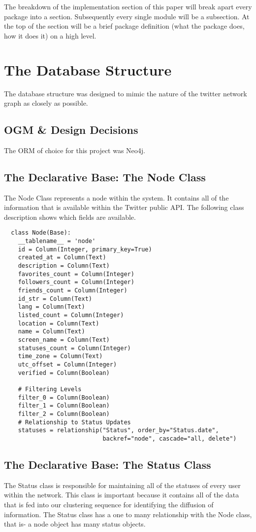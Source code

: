 The breakdown of the implementation section of this paper will break
apart every package into a section. Subsequently every single module
will be a subsection. At the top of the section will be a brief
package definition (what the package does, how it does it) on a high
level.

\section{The Database Structure}
The database structure was designed to mimic the nature of the twitter
network graph as closely as possible.

\subsection{OGM \& Design Decisions}
The ORM of choice for this project was Neo4j.

\subsection{The Declarative Base: The Node Class}
The Node Class represents a node within the system. It contains all of
the information that is available within the Twitter public API. The
following class description shows which fields are available.

\begin{lstlisting}
  class Node(Base):
    __tablename__ = 'node'
    id = Column(Integer, primary_key=True)
    created_at = Column(Text)
    description = Column(Text)
    favorites_count = Column(Integer)
    followers_count = Column(Integer)
    friends_count = Column(Integer)
    id_str = Column(Text)
    lang = Column(Text)
    listed_count = Column(Integer)
    location = Column(Text)
    name = Column(Text)
    screen_name = Column(Text)
    statuses_count = Column(Integer)
    time_zone = Column(Text)
    utc_offset = Column(Integer)
    verified = Column(Boolean)

    # Filtering Levels
    filter_0 = Column(Boolean)
    filter_1 = Column(Boolean)
    filter_2 = Column(Boolean)
    # Relationship to Status Updates
    statuses = relationship("Status", order_by="Status.date",
                            backref="node", cascade="all, delete")
\end{lstlisting}

\subsection{The Declarative Base: The  Status Class}
The Status class is responsible for maintaining all of the statuses of
every user within the network. This class is important because it
contains all of the data that is fed into our clustering sequence for
identifying the diffusion of information. The Status class has a one
to many relationship with the Node class, that is- a node object has
many status objects.

